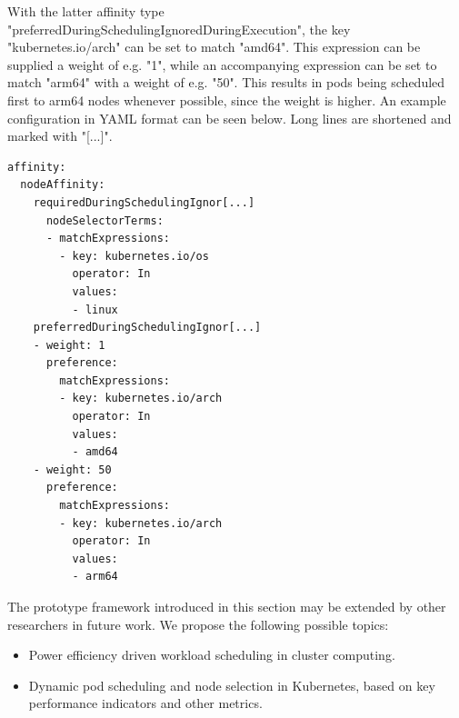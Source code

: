 With the latter affinity type
"preferredDuringSchedulingIgnoredDuringExecution",
the key "kubernetes.io/arch" can be set to match "amd64".
This expression can be supplied a weight of e.g. "1",
while an accompanying expression can be set to match "arm64"
with a weight of e.g. "50". This results in pods
being scheduled first to arm64 nodes whenever possible,
since the weight is higher. An example configuration
in YAML format can be seen below. Long lines are
shortened and marked with "[...]".

\begin{verbatim}
affinity:
  nodeAffinity:
    requiredDuringSchedulingIgnor[...]
      nodeSelectorTerms:
      - matchExpressions:
        - key: kubernetes.io/os
          operator: In
          values:
          - linux
    preferredDuringSchedulingIgnor[...]
    - weight: 1
      preference:
        matchExpressions:
        - key: kubernetes.io/arch
          operator: In
          values:
          - amd64
    - weight: 50
      preference:
        matchExpressions:
        - key: kubernetes.io/arch
          operator: In
          values:
          - arm64
\end{verbatim}

The prototype framework introduced in this section
may be extended by other researchers
in future work. We propose the following possible topics:

\begin{itemize}
    \item Power efficiency driven workload scheduling in cluster computing.
    \item Dynamic pod scheduling and node selection in Kubernetes, based on key performance indicators and other metrics.
\end{itemize}
